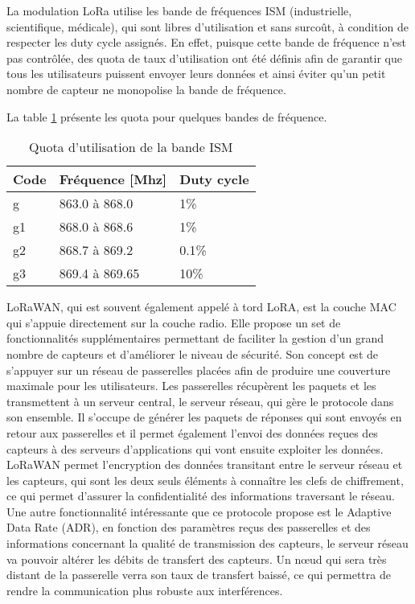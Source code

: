 La modulation LoRa utilise les bande de fréquences ISM (industrielle, scientifique, médicale), qui sont libres d'utilisation et sans surcoût, à condition de respecter les duty cycle assignés. En effet, puisque cette bande de fréquence n'est pas contrôlée, des quota de taux d'utilisation ont été définis afin de garantir que tous les utilisateurs puissent envoyer leurs données et ainsi éviter qu'un petit nombre de capteur ne monopolise la bande de fréquence. \cite{ism_bands}

La table \ref{tab:bande_ism} présente les quota pour quelques bandes de fréquence.

\begin{table}[htb]
\caption{Quota d'utilisation de la bande ISM}
\label{tab:bande_ism}
\centering
\begin{tabular}{ l l l }
\toprule
Code & Fréquence [Mhz] & Duty cycle \\
\midrule
g & 863.0 à 868.0 & 1\% \\
g1 & 868.0 à 868.6 & 1\% \\
g2 & 868.7 à 869.2 & 0.1\% \\
g3 & 869.4 à 869.65 & 10\% \\
\bottomrule 
\end{tabular}
\end{table}

LoRaWAN, qui est souvent également appelé à tord LoRA, est la couche MAC qui s'appuie directement sur la couche radio. Elle propose un set de fonctionnalités supplémentaires permettant de faciliter la gestion d'un grand nombre de capteurs et d'améliorer le niveau de sécurité. Son concept est de s'appuyer sur un réseau de passerelles placées afin de produire une couverture maximale pour les utilisateurs. Les passerelles récupèrent les paquets et les transmettent à un serveur central, le serveur réseau, qui gère le protocole dans son ensemble. Il s'occupe de générer les paquets de réponses qui sont envoyés en retour aux passerelles et il permet également l'envoi des données reçues des capteurs à des serveurs d'applications qui vont ensuite exploiter les données. LoRaWAN permet l'encryption des données transitant entre le serveur réseau et les capteurs, qui sont les deux seuls éléments à connaître les clefs de chiffrement, ce qui permet d'assurer la confidentialité des informations traversant le réseau. Une autre fonctionnalité intéressante que ce protocole propose est le Adaptive Data Rate (ADR), en fonction des paramètres reçus des passerelles et des informations concernant la qualité de transmission des capteurs, le serveur réseau va pouvoir altérer les débits de transfert des capteurs. Un nœud qui sera très distant de la passerelle verra son taux de transfert baissé, ce qui permettra de rendre la communication plus robuste aux interférences. \cite{lorawan_spec}

